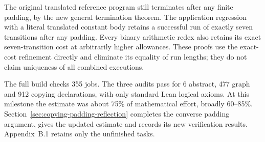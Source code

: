 



The original translated reference program still terminates after any
finite padding, by the new general termination theorem. The application
regression with a literal translated constant body retains a successful run
of exactly seven transitions after any padding. Every binary arithmetic redex
also retains its exact seven-transition cost at arbitrarily higher allowances.
These proofs use the exact-cost refinement directly and eliminate its equality
of run lengths; they do not claim uniqueness of all combined executions.




The full build checks 355 jobs. The three audits pass for 6 abstract,
477 graph and 912 copying declarations, with only standard Lean logical
axioms. At this milestone the estimate was about 75\% of mathematical effort,
broadly 60--85\%. Section~\ref{sec:copying-padding-reflection} completes the
converse padding argument, gives the updated estimate and records its new
verification results. Appendix~B.1 retains only the unfinished tasks.

